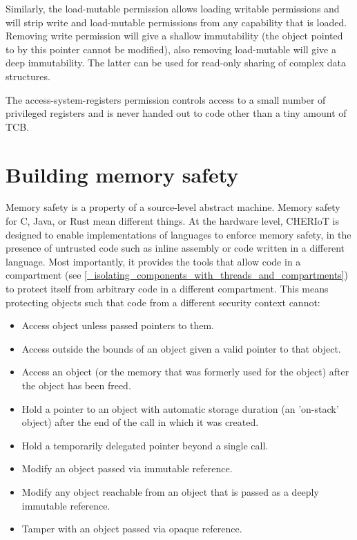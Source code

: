 Similarly, the load-mutable permission allows loading writable permissions and will strip write and load-mutable permissions from any capability that is loaded.
Removing write permission will give a shallow immutability (the object pointed to by this pointer cannot be modified), also removing load-mutable will give a deep immutability.
The latter can be used for read-only sharing of complex data structures.

The access-system-registers permission controls access to a small number of privileged registers and is never handed out to code other than a tiny amount of TCB.

\section{Building memory safety}

Memory safety is a property of a source-level abstract machine.
Memory safety for C, Java, or Rust mean different things.
At the hardware level, CHERIoT is designed to enable implementations of languages to enforce memory safety, in the presence of untrusted code such as inline assembly or code written in a different language.
Most importantly, it provides the tools that allow code in a compartment (see \ref{_isolating_components_with_threads_and_compartments}) to protect itself from arbitrary code in a different compartment.
This means protecting objects such that code from a different security context cannot:

\begin{itemize}
	\item{Access object unless passed pointers to them.}
	\item{Access outside the bounds of an object given a valid pointer to that object.}
	\item{Access an object (or the memory that was formerly used for the object) after the object has been freed.}
	\item{Hold a pointer to an object with automatic storage duration (an 'on-stack' object) after the end of the call in which it was created.}
	\item{Hold a temporarily delegated pointer beyond a single call.}
	\item{Modify an object passed via immutable reference.}
	\item{Modify any object reachable from an object that is passed as a deeply immutable reference.}
	\item{Tamper with an object passed via opaque reference.}
\end{itemize}

